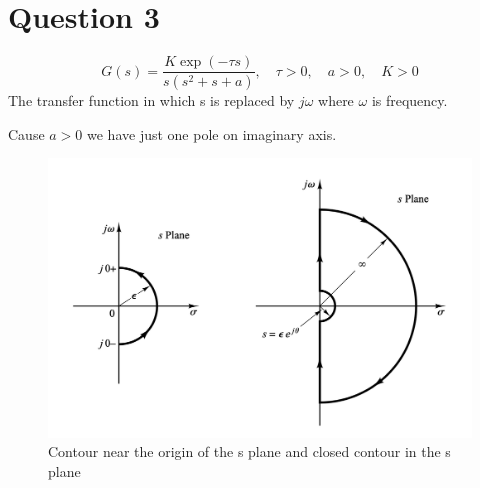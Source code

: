 \section{Question 3}
\begin{equation}
	G(s) = \dfrac{K\exp(-\tau s)}{s(s^2 + s + a)}, \quad \tau>0, \quad a > 0, \quad K > 0
\end{equation}
The transfer function in which s is replaced by $j\omega$ where $\omega$ is frequency.

Cause $a>0$ we have just one pole on imaginary axis.
\begin{figure}[H]
	\caption{Contour near the origin of the s plane and closed contour in the s plane}
	\centering
	\includegraphics[width=12cm]{../Figure/Q2/nyquist_s_plane.png}
\end{figure}
